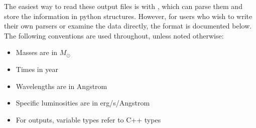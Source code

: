 \documentclass[letterpaper,10pt,english]{sphinxmanual}
\begin{document}
The easiest way to read these output files is with {\hyperref[\detokenize{slugpy:sec-slugpy}]{}}, which can parse them and store the information in python structures. However, for users who wish to write their own parsers or examine the data directly, the format is documented below. The following conventions are used throughout, unless noted otherwise:
\begin{itemize}
\item {} 
Masses are in \(M_\odot\)

\item {} 
Times in year

\item {} 
Wavelengths are in Angstrom

\item {} 
Specific luminosities are in erg/s/Angstrom

\item {} 
For  outputs, variable types refer to C++ types

\end{itemize}
\end{document}
